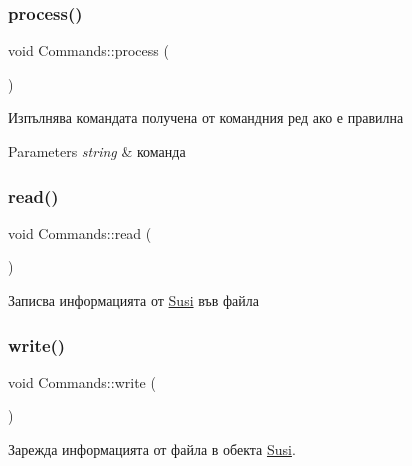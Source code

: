 \subsubsection{\texorpdfstring{process()}{process()}}
{\footnotesize\ttfamily void Commands\+::process (\begin{DoxyParamCaption}\item[{std\+::string \&}]{ }\end{DoxyParamCaption})}



Изпълнява командата получена от командния ред ако е правилна 


\begin{DoxyParams}{Parameters}
{\em string} & команда \\
\hline
\end{DoxyParams}
\mbox{\label{class_commands_acd316fdb9569d4b2a7860ca86d7af6c1}} 
\subsubsection{\texorpdfstring{read()}{read()}}
{\footnotesize\ttfamily void Commands\+::read (\begin{DoxyParamCaption}{ }\end{DoxyParamCaption})}



Записва информацията от \hyperlink{class_susi}{Susi} във файла 

\mbox{\label{class_commands_a20c079b35574ed9f13dd29cee68f25f9}} 
\subsubsection{\texorpdfstring{write()}{write()}\hspace{0.1cm}{\footnotesize\ttfamily [1/2]}}
{\footnotesize\ttfamily void Commands\+::write (\begin{DoxyParamCaption}{ }\end{DoxyParamCaption})}



Зарежда информацията от файла в обекта \hyperlink{class_susi}{Susi}. 

\mbox{\label{class_commands_a3a46d1e3934cfe1999476486473ad64c}} 
